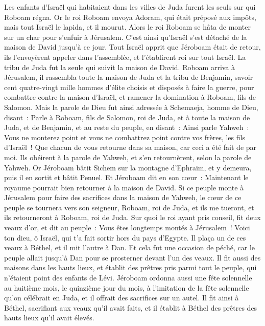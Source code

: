 \begin{multicols}{2}
Les enfants d'Israël qui habitaient dans les villes de Juda furent les seuls sur qui Roboam régna.
Or le roi Roboam envoya Adoram, qui était préposé aux impôts, mais tout Israël le lapida, et il mourut. Alors le roi Roboam se hâta de monter sur un char pour s'enfuir à Jérusalem.
C'est ainsi qu'Israël s'est détaché de la maison de David jusqu'à ce jour.
Tout Israël apprit que Jéroboam était de retour, ils l'envoyèrent appeler dans l'assemblée, et l'établirent roi sur tout Israël. La tribu de Juda fut la seule qui suivit la maison de David.
Roboam arriva à Jérusalem, il rassembla toute la maison de Juda et la tribu de Benjamin, savoir cent quatre-vingt mille hommes d'élite choisis et disposés à faire la guerre, pour combattre contre la maison d'Israël, et ramener la domination à Roboam, fils de Salomon.
Mais la parole de Dieu fut ainsi adressée à Schemaeja, homme de Dieu, disant~:
Parle à Roboam, fils de Salomon, roi de Juda, et à toute la maison de Juda, et de Benjamin, et au reste du peuple, en disant~:
Ainsi parle Yahweh~: Vous ne monterez point et vous ne combattrez point contre vos frères, les fils d'Israël~! Que chacun de vous retourne dans sa maison, car ceci a été fait de par moi. Ils obéirent à la parole de Yahweh, et s'en retournèrent, selon la parole de Yahweh.
Or Jéroboam bâtit Sichem sur la montagne d'Ephraïm, et y demeura, puis il en sortit et bâtit Penuel.
Et Jéroboam dit en son cœur~: Maintenant le royaume pourrait bien retourner à la maison de David.
Si ce peuple monte à Jérusalem pour faire des sacrifices dans la maison de Yahweh, le cœur de ce peuple se tournera vers son seigneur, Roboam, roi de Juda, et ils me tueront, et ils retourneront à Roboam, roi de Juda.
Sur quoi le roi ayant pris conseil, fit deux veaux d'or, et dit au peuple~: Vous êtes longtemps montés à Jérusalem~! Voici ton dieu, ô Israël, qui t'a fait sortir hors du pays d'Egypte.
Il plaça un de ces veaux à Béthel, et il mit l'autre à Dan.
Et cela fut une occasion de péché, car le peuple allait jusqu'à Dan pour se prosterner devant l'un des veaux.
Il fit aussi des maisons dans les hauts lieux, et établit des prêtres pris parmi tout le peuple, qui n'étaient point des enfants de Lévi.
Jéroboam ordonna aussi une fête solennelle au huitième mois, le quinzième jour du mois, à l'imitation de la fête solennelle qu'on célébrait en Juda, et il offrait des sacrifices sur un autel. Il fit ainsi à Béthel, sacrifiant aux veaux qu'il avait faits, et il établit à Béthel des prêtres des hauts lieux qu'il avait élevés.

\end{multicols}
